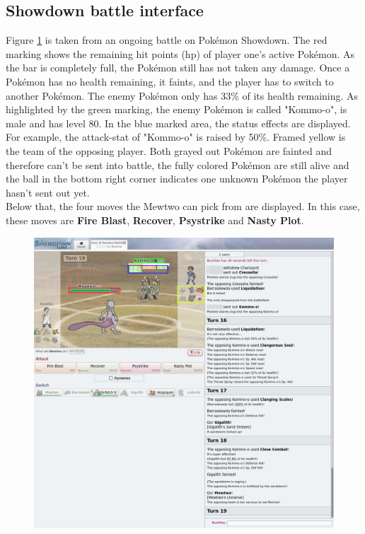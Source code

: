 \documentclass{article}
\begin{document}
\subsection{Showdown battle interface}
Figure \ref{fig:showdown-battle} is taken from an ongoing battle on Pokémon
Showdown. The red marking shows the remaining hit points (hp) of player one's
active Pokémon. As the bar is completely full, the Pokémon still has 
not taken any damage. Once a Pokémon has no health remaining, it faints,
and the player has to switch to another Pokémon. 
The enemy Pokémon
only has 33\% of its health remaining. As highlighted by the green 
marking, the enemy Pokémon is called "Kommo-o", is male and has
level 80. In the blue marked area, the status effects are displayed. For
example, the attack-stat of "Kommo-o" is raised by 50\%. Framed
yellow is the team of the opposing player. Both grayed out
Pokémon are fainted and therefore can't be sent into battle,
the fully colored Pokémon are still alive and the ball in
the bottom right corner indicates one unknown Pokémon the 
player hasn't sent out yet. \\
Below that, the four moves the Mewtwo can pick from are displayed.
In this case, these moves are \textbf{Fire Blast}, \textbf{Recover},
\textbf{Psystrike} and \textbf{Nasty Plot}.

\begin{figure}[ht]
  \centering
  \includegraphics[width=.9\linewidth]{images/Showdown.png}
  \label{fig:showdown-battle}
\end{figure}
\end{document}
